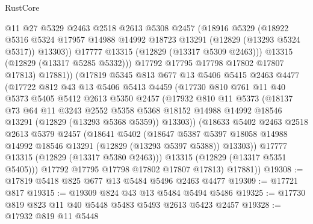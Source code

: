 \begin{lexlean}{RustCore}
\begin{coremodule}
                @11
                @27
                @5329
                @2463
                @2518
                @2613
                @5308
                @2457
                (@18916
                  @5329
                  (@18922
                    @5316
                    @5324
                    @17957
                    @14988
                    @14992
                    @18723
                    @13291
                    (@12829 (@13293 @5324 @5317))
                    @13303))
                @17777
                @13315
                (@12829 (@13317 @5309 @2463)))
              @13315
              (@12829 (@13317 @5285 @5332)))
            @17792
            @17795
            @17798
            @17802
            @17807
            @17813)
          @17881))
      (@17819
        @5345
        @813
        @677
        @13
        @5406
        @5415
        @2463
        @4477
        (@17722
          @812
          @43
          @13
          @5406
          @5413
          @4459
          (@17730
            @810
            @761
            @11
            @40
            @5373
            @5405
            @5412
            @2613
            @5350
            @2457
            (@17932
              @810
              @11
              @5373
              (@18137
                @73
                @64
                @11
                @3243
                @2552
                @5358
                @5368
                @18152
                @14988
                @14992
                @18546
                @13291
                (@12829 (@13293 @5368 @5359))
                @13303))
            (@18633
              @5402
              @2463
              @2518
              @2613
              @5379
              @2457
              (@18641
                @5402
                (@18647
                  @5387
                  @5397
                  @18058
                  @14988
                  @14992
                  @18546
                  @13291
                  (@12829 (@13293 @5397 @5388))
                  @13303))
              @17777
              @13315
              (@12829 (@13317 @5380 @2463)))
            @13315
            (@12829 (@13317 @5351 @5405)))
          @17792
          @17795
          @17798
          @17802
          @17807
          @17813)
        @17881))
@19308 := @17819 @5418 @825 @677 @13 @5484 @5496 @2463 @4477
@19309 := @17721 @817
@19315 := @19309 @824 @43 @13 @5484 @5494 @5486
@19325 := @17730 @819 @823 @11 @40 @5448 @5483 @5493 @2613 @5423 @2457
@19328 := @17932 @819 @11 @5448

\end{coremodule}
\end{lexlean}
